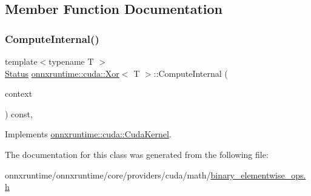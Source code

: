 \subsection{Member Function Documentation}
\mbox{\label{classonnxruntime_1_1cuda_1_1Xor_ab631fd2ac34805590ed062a4dfea8bdc}} 
\subsubsection{\texorpdfstring{Compute\+Internal()}{ComputeInternal()}}
{\footnotesize\ttfamily template$<$typename T $>$ \\
\mbox{\hyperlink{classonnxruntime_1_1common_1_1Status}{Status}} \mbox{\hyperlink{classonnxruntime_1_1cuda_1_1Xor}{onnxruntime\+::cuda\+::\+Xor}}$<$ T $>$\+::Compute\+Internal (\begin{DoxyParamCaption}\item[{\mbox{\hyperlink{classonnxruntime_1_1OpKernelContext}{Op\+Kernel\+Context}} $\ast$}]{context }\end{DoxyParamCaption}) const\hspace{0.3cm}{\ttfamily [override]}, {\ttfamily [virtual]}}



Implements \mbox{\hyperlink{classonnxruntime_1_1cuda_1_1CudaKernel_aca7af04ae448017d6023d30bba231ebb}{onnxruntime\+::cuda\+::\+Cuda\+Kernel}}.



The documentation for this class was generated from the following file\+:\begin{DoxyCompactItemize}
\item 
onnxruntime/onnxruntime/core/providers/cuda/math/\mbox{\hyperlink{binary__elementwise__ops_8h}{binary\+\_\+elementwise\+\_\+ops.\+h}}\end{DoxyCompactItemize}

